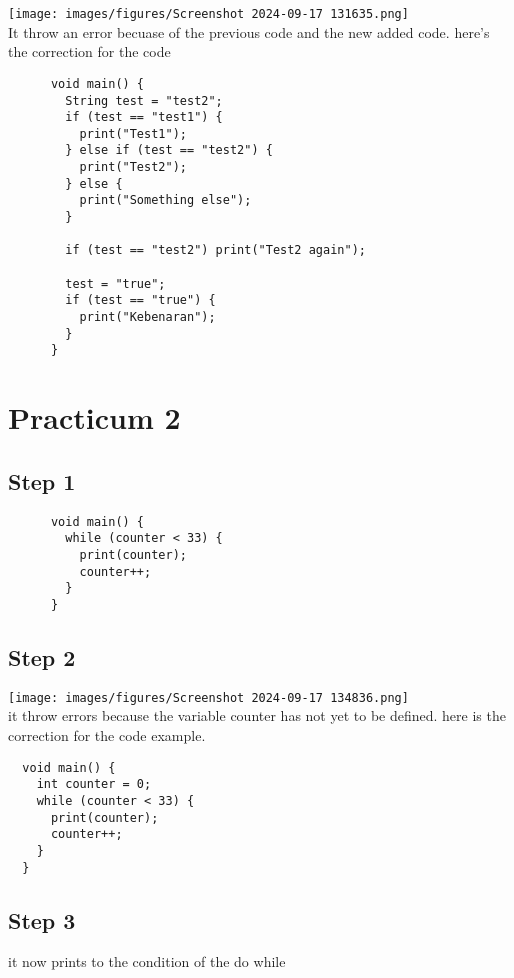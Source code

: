 \documentclass[12pt,titlepage]{article}
\begin{document}
\texttt{[image: images/figures/Screenshot 2024-09-17 131635.png]} \\ 
It throw an error becuase of the previous code and the new added code. here's the correction for the code \\

\begin{verbatim}
      void main() {
        String test = "test2";
        if (test == "test1") {
          print("Test1");
        } else if (test == "test2") {
          print("Test2");
        } else {
          print("Something else");
        }
      
        if (test == "test2") print("Test2 again");
        
        test = "true";
        if (test == "true") {
          print("Kebenaran");
        }
      }
\end{verbatim}

\newpage

\section*{Practicum 2}
\subsection*{Step 1}
\begin{verbatim}
      void main() {
        while (counter < 33) {
          print(counter);
          counter++;
        }
      }
\end{verbatim}
\subsection*{Step 2}
\texttt{[image: images/figures/Screenshot 2024-09-17 134836.png]} \\ 
it throw errors because the variable counter has not yet to be defined. here is the correction for the code example.
\begin{verbatim}
  void main() {
    int counter = 0;
    while (counter < 33) {
      print(counter);
      counter++;
    }
  }
\end{verbatim}
\subsection*{Step 3}
it now prints to the condition of the do while
\end{document}
